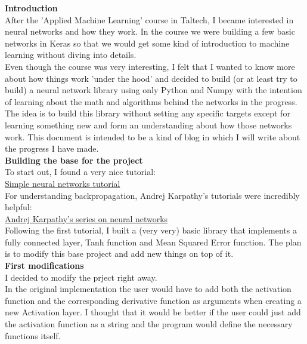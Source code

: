 \documentclass{article}
\begin{document}
\textbf{Introduction} \\

After the 'Applied Machine Learning' course in Taltech, I became interested in
neural networks and how they work. In the course we were building a few basic networks 
in Keras so that we would get some kind of introduction to machine learning without 
diving into details.\\

Even though the course was very interesting, I felt that I wanted to know more about 
how things work 'under the hood' and decided to build (or at least try to build) a neural network library
using only Python and Numpy with the intention of learning about the math and algorithms behind the networks in the
progress.\\

The idea is to build this library without setting any specific targets except for learning
something new and form an understanding about how those networks work. This document is intended 
to be a kind of blog in which I will write about the progress I have made.\\

\textbf{Building the base for the project} \\

To start out, I found a very nice tutorial:\\
\href{https://towardsdatascience.com/math-neural-network-from-scratch-in-python-d6da9f29ce65}{Simple neural networks tutorial} \\
For understanding backpropagation, Andrej Karpathy's tutorials were incredibly helpful: \\
\href{https://www.youtube.com/watch?v=VMj-3S1tku0&list=PLAqhIrjkxbuWI23v9cThsA9GvCAUhRvKZ}{Andrej Karpathy's series on neural networks} \\

Following the first tutorial, I built a (very very) basic library that implements a fully connected layer, Tanh function and 
Mean Squared Error function. The plan is to modify this base project and add new things on top of it. \\

\textbf{First modifications} \\

I decided to modify the prject right away. \\

In the original implementation the user would have to add both the activation function and the corresponding derivative 
function as arguments when creating a new Activation layer. I thought that it would be better if the user could just add 
the activation function as a string and the program would define the necessary functions itself. \\
\end{document}
